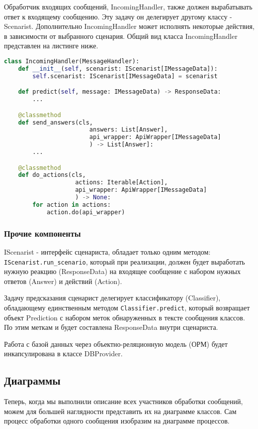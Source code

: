     Обработчик входящих сообщений, IncomingHandler, также должен вырабатывать ответ
    к входящему сообщению. Эту задачу он делегирует другому классу - Scenarist.
    Дополнительно IncomingHandler может исполнять некоторые действия,
    в зависимости от выбранного сценария.
    Общий вид класса IncomingHandler представлен на листинге ниже.
\begin{lstlisting}[language=Python]
class IncomingHandler(MessageHandler):
    def __init__(self, scenarist: IScenarist[IMessageData]):
        self.scenarist: IScenarist[IMessageData] = scenarist

    def predict(self, message: IMessageData) -> ResponseData:
        ...

    @classmethod
    def send_answers(cls,
                        answers: List[Answer],
                        api_wrapper: ApiWrapper[IMessageData]
                        ) -> List[Answer]:
        ...

    @classmethod
    def do_actions(cls,
                    actions: Iterable[Action], 
                    api_wrapper: ApiWrapper[IMessageData]
                    ) -> None:
        for action in actions:
            action.do(api_wrapper)
\end{lstlisting}

    \subsubsection{Прочие компоненты}
    IScenarist - интерфейс сценариста, обладает только одним методом:\\
    \lstinline{IScenarist.run_scenario}, который при реализации, должен будет
    выработать нужную реакцию (ResponseData) на входящее сообщение с набором
    нужных ответов (Answer) и действий (Action).

    Задачу предсказания сценарист делегирует классификатору (Classifier),
    обладающему единственным методом \lstinline{Classifier.predict}, который
    возвращает объект Prediction с набором меток обнаруженных в тексте сообщения классов.
    По этим меткам и будет составлена ResponseData внутри сценариста.

    Работа с базой данных через объектно-реляционную модель (ОРМ) будет инкапсулирована
    в классе DBProvider.

    \subsection{Диаграммы}
    Теперь, когда мы выполнили описание всех участников обработки сообщений,
    можем для большей наглядности представить их на диаграмме классов. Сам процесс
    обработки одного сообщения изобразим на диаграмме процессов.

